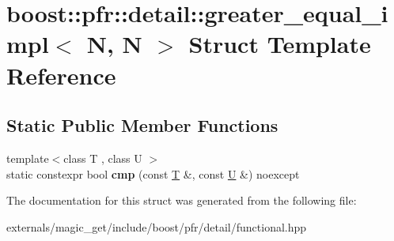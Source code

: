 \hypertarget{structboost_1_1pfr_1_1detail_1_1greater__equal__impl_3_01_n_00_01_n_01_4}{}\section{boost\+:\+:pfr\+:\+:detail\+:\+:greater\+\_\+equal\+\_\+impl$<$ N, N $>$ Struct Template Reference}
\label{structboost_1_1pfr_1_1detail_1_1greater__equal__impl_3_01_n_00_01_n_01_4}
\subsection*{Static Public Member Functions}
\begin{DoxyCompactItemize}
\item 
\mbox{\label{structboost_1_1pfr_1_1detail_1_1greater__equal__impl_3_01_n_00_01_n_01_4_abcc7deaa28308251a7dc7d220b659676}} 
{\footnotesize template$<$class T , class U $>$ }\\static constexpr bool {\bfseries cmp} (const \mbox{\hyperlink{struct_t}{T}} \&, const \mbox{\hyperlink{union_u}{U}} \&) noexcept
\end{DoxyCompactItemize}


The documentation for this struct was generated from the following file\+:\begin{DoxyCompactItemize}
\item 
externals/magic\+\_\+get/include/boost/pfr/detail/functional.\+hpp\end{DoxyCompactItemize}
